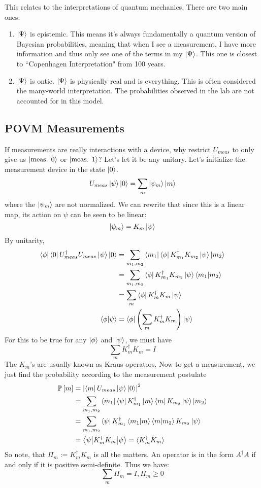 This relates to the interpretations of quantum mechanics. There are two main ones:
\begin{enumerate}
    \item $\ket{\Psi}$ is epistemic. This means it's always fundamentally a quantum version of Bayesian probabilities, meaning that when I see a measurement, I have more information and thus only see one of the terms in my $\ket{\Psi}$.
    This one is closest to ``Copenhagen Interpretation" from 100 years.
    \item $\ket{\Psi}$ is ontic. $\ket{\Psi}$ is physically real and is everything. This is often considered the many-world interpretation. The probabilities observed in the lab are not accounted for in this model.
\end{enumerate}

\subsection{POVM Measurements}
If measurements are really interactions with a device, why restrict $U_{meas}$ to only give us $\ket{\text{meas. } 0}$ or $\ket{\text{meas. } 1}$?
Let's let it be any unitary. Let's initialize the measurement device in the state $\ket{0}$.
\[ U_{meas} \ket{\psi} \ket{0} = \sum_{m} \ket{\psi_m} \ket{m} \]
where the $\ket{\psi_m}$ are not normalized. We can rewrite that since this is a linear map, its action on $\psi$ can be seen to be linear:
\[ \ket{\psi_m} = K_m \ket{\psi} \]
By unitarity,
\begin{align*}
    \bra{\phi} \bra{0} U_{meas}^{\dagger} U_{meas} \ket{\psi} \ket{0} &= \sum_{m_1, m_2} \bra{m_1} \bra{\phi} K_{m_1}^{\dagger} K_{m_2} \ket{\psi} \ket{m_2} \\
    &= \sum_{m_1, m_2} \bra{\phi} K_{m_1}^{\dagger} K_{m_2} \ket{\psi} \braket{m_1}{m_2} \\
    &= \sum_m \bra{\phi} K_m^{\dagger} K_m \ket{\psi}  \\
    \braket{\phi}{\psi} &= \bra{\phi} \qty(\sum_m K_m^{\dagger} K_m) \ket{\psi}
\end{align*}
For this to be true for any $\ket{\phi}$ and $\ket{\psi}$, we must have
\[ \sum_m K_m^{\dagger} K_m = I \]
The $K_m$'s are usually known as Kraus operators. Now to get a measurement, we just find the probability
according to the measurement postulate
\begin{align*}
    \mathbb{P}\left[ m \right] &=  \qty|\bra{m} U_{meas} \ket{\psi} \ket{0}|^2 \\
    &= \sum_{m_1, m_2} \bra{m_1} \bra{\psi} K_{m_1}^{\dagger} \ket{m} \bra{m} K_{m_2} \ket{\psi} \ket{m_2}\\
    &= \sum_{m_1, m_2} \bra{\psi} K_{m_1}^{\dagger}  \braket{m_1}{m} \braket{m}{m_2} K_{m_2} \ket{\psi} \\
    &= \mel**{\psi}{K_m^{\dagger} K_m}{\psi} = \langle K_m^{\dagger} K_m \rangle
\end{align*}
So note, that $\Pi_m := K_m^{\dagger} K_m$ is all the matters. An operator is in the form $A^{\dagger} A$ if and only if it is positive semi-definite.
Thus we have:
\[ \sum_m \Pi_m = I, \Pi_m \geq 0\]

